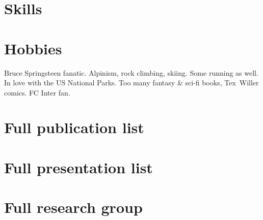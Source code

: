 \vspace{-0.32cm}

\section{Skills}

\vspace{-0.32cm}
\section{Hobbies}
Bruce Springsteen fanatic. Alpinism, rock climbing, skiing. Some running as well. In love with the US National Parks. Too many fantasy \& sci-fi books, Tex~Willer comics. FC Inter fan. 


\pagebreak
\section{Full publication list}\vspace{0.2cm} 



\pagebreak
\section{Full presentation list}\vspace{0.2cm} 



\pagebreak
\section{Full research group}\vspace{0.2cm} 




